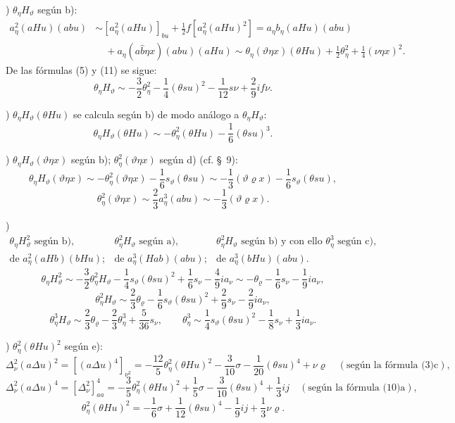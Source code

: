 \documentclass[11pt]{article}
\newcommand{\A}{\Delta}
\newcommand{\R}{\varrho}
\begin{document}
) $\theta_\eta H_\vartheta$ según b):
\[
\begin{aligned}
a_\eta^2(aHu)(abu)&\sim [a_\eta^2(aHu)]_{bu}+\frac12 f[a_\eta^2(aHu)^2]
=a_\eta b_\eta(aHu)(abu)\\
&\quad+a_\eta(a\widehat{b}\eta x)(abu)(aHu)
\sim \theta_\eta(\vartheta\eta x)(\theta Hu)+\frac12\theta_\eta^2+\frac14(\nu\eta x)^2.
\end{aligned}
\]
De las fórmulas (5) y (11) se sigue:
\[
\theta_\eta H_\vartheta\sim -\frac32\theta_\eta^2-\frac14(\theta su)^2-\frac1{12}s\nu+\frac29if\nu.
\]

) $\theta_\eta H_\vartheta(\theta Hu)$ se calcula según b) de modo análogo a $\theta_\eta H_\vartheta$:
\[
\theta_\eta H_\vartheta(\theta Hu)\sim-\theta_\eta^2(\theta Hu)-\frac16(\theta su)^3.
\]

) $\theta_\eta H_\vartheta(\vartheta\eta x)$ según b); $\theta_\eta^2(\vartheta\eta x)$ según d) (cf. \S\ 9):
\[
\theta_\eta H_\vartheta(\vartheta\eta x)\sim-\theta_\eta^2(\vartheta\eta x)-\frac16s_\vartheta(\theta su)
\sim-\frac13(\vartheta\R x)-\frac16s_\vartheta(\theta su),
\]
\[
\theta_\eta^2(\vartheta\eta x)\sim\frac23a_\eta^3(abu)\sim-\frac13(\vartheta\R x).
\]

)
\[
\begin{array}{ccc}
\theta_\eta H_\vartheta^2\text{ según b)},&
\theta_\eta^2H_\vartheta\text{ según a)},&
\theta_\eta^2H_\vartheta\text{ según b) y con ello }\theta_\eta^3\text{ según c)},\\
\text{de }a_\eta^2(aHb)(bHu);&
\text{de }a_\eta^3(Hab)(abu);&
\text{de }a_\eta^3(bHu)(abu).
\end{array}
\]
\[
\theta_\eta H_\vartheta^2\sim-\frac32\theta_\eta^2H_\vartheta-\frac14s_\vartheta(\theta su)^2+\frac16s_\nu-\frac49ia_\nu
\sim-\theta_\R-\frac16s_\nu-\frac19ia_\nu,
\]
\[
\theta_\eta^2H_\vartheta\sim\frac23\theta_\R-\frac16s_\vartheta(\theta su)^2+\frac29s_\nu-\frac29ia_\nu,
\]
\[
\theta_\eta^3H_\vartheta\sim\frac23\theta_\R-\frac23\theta_\eta^3+\frac5{36}s_\nu,
\qquad
\theta_\eta^3\sim\frac14s_\vartheta(\theta su)^2-\frac18s_\nu+\frac13ia_\nu.
\]

) $\theta_\eta^2(\theta Hu)^2$ según e):
\[
\A_\nu^2(a\A u)^2=[(a\A u)^4]_{\nu^2}
=-\frac{12}{5}\theta_\eta^2(\theta Hu)^2-\frac3{10}\sigma-\frac1{20}(\theta su)^4+\nu\R
\quad(\text{según la fórmula (3)c}),
\]
\[
\A_\nu^2(a\A u)^4=[\A_\nu^2]_{aa}^4=-\frac35\theta_\eta^2(\theta Hu)^2+\frac15\sigma-\frac3{10}(\theta su)^4+\frac13ij
\quad(\text{según la fórmula (10)a}),
\]
\[
\theta_\eta^2(\theta Hu)^2=-\frac16\sigma+\frac1{12}(\theta su)^4-\frac19ij+\frac13\nu\R.
\]
\end{document}
